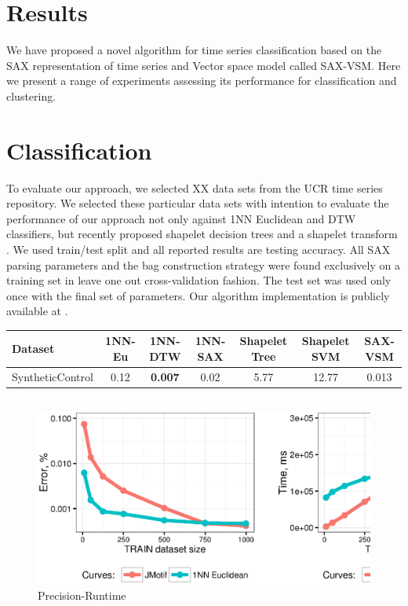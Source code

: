 \documentclass{llncs}
\begin{document}
\section{Results}
We have proposed a novel algorithm for time series classification based on the SAX
representation of time series and Vector space model called SAX-VSM. Here we present a range of
experiments assessing its performance for classification and clustering.

\section{Classification}
To evaluate our approach, we selected XX data sets from the UCR time series repository.
We selected these particular data sets with intention to evaluate the performance of our approach
not only against 1NN Euclidean and DTW classifiers, but recently proposed shapelet decision trees
and a shapelet transform \cite{bagnal}.
We used train/test split and all reported results are testing accuracy. All SAX parsing parameters
and the bag construction strategy were found exclusively on a training set in leave one out 
cross-validation fashion. The test set was used only once with the final set of parameters. 
Our algorithm implementation is publicly available at \cite{jmotif}.

{\scriptsize

\begin{tabular}{|  l | c | c | c | c | c |  c | }
  \hline
  Dataset & 1NN-Eu & 1NN-DTW & 1NN-SAX & Shapelet Tree & Shapelet SVM & SAX-VSM \\
  \hline
  SyntheticControl  & 0.12  & \textbf{0.007} & 0.02 & 5.77 & 12.77 & 0.013 \\
  
\end{tabular}

}

\subsection{}
\begin{figure}[tbp]
   \centering
   \includegraphics[width=130mm]{figures/precision-runtime.ps}
   \caption{Precision-Runtime}
   \label{fig:precision-runtime}
\end{figure}
\end{document}
